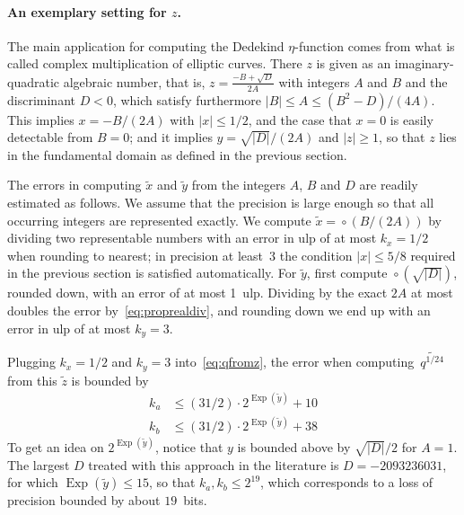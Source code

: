 \documentclass [11pt]{article}
\newcommand {\appro}[1]{\widetilde {#1}}
\newcommand {\ulp}[1]{#1~ulp}
\DeclareMathOperator{\Exp}{\operatorname {Exp}}
\newcommand {\round}{\operatorname {\circ}}
\renewcommand {\leq}{\leqslant}
\renewcommand {\geq}{\geqslant}
\begin{document}
\paragraph {An exemplary setting for $z$.}

The main application for computing the Dedekind $\eta$-function comes from
what is called complex multiplication of elliptic curves. There $z$ is
given as an imaginary-quadratic algebraic number, that is,
$z = \frac {-B + \sqrt {D}}{2 A}$ with integers $A$ and $B$ and the
discriminant $D < 0$, which satisfy furthermore
$|B| \leq A \leq (B^2 - D) / (4 A)$.
This implies $x = - B / (2A)$ with $|x| \leq 1/2$, and the case that
$x = 0$ is easily detectable from $B = 0$; and it implies
$y = \sqrt {|D|} / (2 A)$ and $|z| \geq 1$, so that $z$ lies in the
fundamental domain as defined in the previous section.

The errors in computing $\appro x$ and $\appro y$ from the integers
$A$, $B$ and $D$ are readily estimated as follows. We assume that the
precision is large enough so that all occurring integers are represented
exactly.
We compute $\appro x = \round (B / (2A))$ by dividing two representable
numbers with an error in ulp of at most $k_x = 1/2$ when rounding to
nearest; in precision at least~$3$ the condition $|x| \leq 5/8$ required
in the previous section is satisfied automatically.
For $\appro y$, first compute $\round \left( \sqrt {|D|} \right)$, rounded
down, with an error of at most \ulp {1}. Dividing by the exact $2 A$ at
most doubles the error by~\eqref {eq:proprealdiv}, and rounding down we
end up with an error in ulp of at most $k_y = 3$.

Plugging $k_x = 1/2$ and $k_y = 3$ into~\eqref {eq:qfromz}, the error
when computing~$\appro {q^{1/24}}$ from this $\appro z$ is bounded by
\begin {equation}
\label {eq:qfromzcm}
\begin {aligned}
k_a & \leq (31/2) \cdot 2^{\Exp (\appro y)} + 10 \\
k_b & \leq (31/2) \cdot 2^{\Exp (\appro y)} + 38
\end {aligned}
\end {equation}
To get an idea on $2^{\Exp (\appro y)}$, notice that
$y$ is bounded above by $\sqrt {|D|} / 2$ for $A = 1$.
The largest $D$ treated with this approach in the literature is
$D = -2093236031$\cite {Enge09}, for which
$\Exp (\appro y) \leq 15$, so that
$k_a, k_b \leq 2^{19}$, which corresponds to a loss of precision bounded
by about $19$~bits.


\nocite{Baudin11,Stewart85,Priest04,muller:hal-01766584,jeannerod:ensl-01780265}


\end{document}
